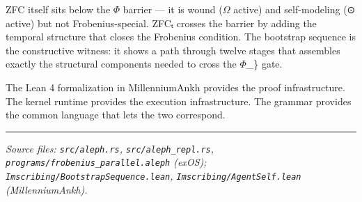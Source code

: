 \documentclass[12pt,a4paper]{article}
\begin{document}
ZFC itself sits below the $\Phi$ barrier --- it is wound ($\Omega$ active) and self-modeling (⊙ active) but not Frobenius-special. ZFCₜ crosses the barrier by adding the temporal structure that closes the Frobenius condition. The bootstrap sequence is the constructive witness: it shows a path through twelve stages that assembles exactly the structural components needed to cross the $\Phi$\_\} gate.

The Lean 4 formalization in MillenniumAnkh provides the proof infrastructure. The kernel runtime provides the execution infrastructure. The grammar provides the common language that lets the two correspond.

\begin{center}
\rule{0.5\textwidth}{0.4pt}
\end{center}

\emph{Source files: \texttt{src/aleph.rs}, \texttt{src/aleph\_repl.rs}, \texttt{programs/frobenius\_parallel.aleph} (exOS); \texttt{Imscribing/BootstrapSequence.lean}, \texttt{Imscribing/AgentSelf.lean} (MillenniumAnkh).}
\end{document}
